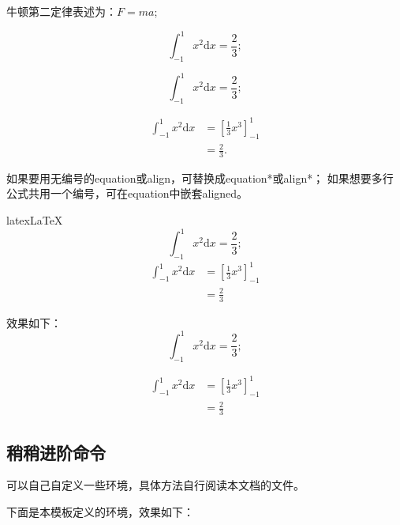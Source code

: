 牛顿第二定律表述为：$F=ma$;

\[
    \int_{-1}^{1}x^2 \textrm{d}x=\frac{2}{3};
\]

\begin{equation}
    \int_{-1}^{1}x^2 \textrm{d}x=\frac{2}{3};
\end{equation}

\begin{align}
    \int_{-1}^{1}x^2 \textrm{d}x&=\left[\frac{1}{3}x^3\right]_{-1}^1\\
    &=\frac{2}{3}.
\end{align}

如果要用无编号的equation或align，可替换成equation*或align*；
如果想要多行公式共用一个编号，可在equation中嵌套aligned。

\begin{envcode}{latex}{LaTeX}
\begin{equation*}
    \int_{-1}^{1}x^2 \textrm{d}x=\frac{2}{3};
\end{equation*}
\begin{equation}
    \begin{aligned}
            \int_{-1}^{1}x^2 \textrm{d}x
            &=\left[\frac{1}{3}x^3\right]_{-1}^1\\
            &=\frac{2}{3}
    \end{aligned}
\end{equation}
\end{envcode}
    
效果如下：
\begin{equation*}
    \int_{-1}^{1}x^2 \textrm{d}x=\frac{2}{3};
\end{equation*}

\begin{equation}
\begin{aligned}
    \int_{-1}^{1}x^2 \textrm{d}x&=\left[\frac{1}{3}x^3\right]_{-1}^1\\
    &=\frac{2}{3}
\end{aligned}
\end{equation}

\subsection{稍稍进阶命令}

可以自己自定义一些环境，具体方法自行阅读本文档的文件。

下面是本模板定义的环境，效果如下：


